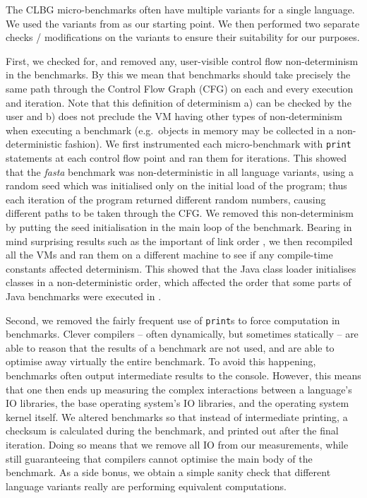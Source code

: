 \documentclass[10pt,preprint]{sigplanconf}
\newcommand{\fasta}{\emph{fasta}\xspace}
\begin{document}
The CLBG micro-benchmarks often have multiple variants for a single language. We
used the variants from \cite{bolz14impact} as our starting point. We then
performed two separate checks / modifications on the variants to ensure their
suitability for our purposes.

First, we checked for, and removed any, user-visible control flow
non-determinism in the benchmarks. By this we mean that benchmarks should take
precisely the same path through the Control Flow Graph (CFG) on each and every
execution and iteration. Note that
this definition of determinism a) can be checked by the user and b) does not
preclude the VM having other types of non-determinism when executing a benchmark
(e.g.~objects in memory may be collected in a non-deterministic fashion). We
first instrumented each micro-benchmark with \texttt{print} statements at each
control flow point and ran them for  iterations. This showed that
the \fasta benchmark was non-deterministic in all language variants, using a random seed which was
initialised only on the initial load of the program; thus each iteration of the
program returned different random numbers, causing different paths to be taken
through the CFG. We removed this non-determinism by putting the seed
initialisation in the main loop of the benchmark. Bearing in mind surprising
results such as the important of link order \cite{mytkowicz09surprising}, we
then recompiled all the VMs and ran them on a different machine to see if any
compile-time constants affected determinism.  This showed that the Java class loader
initialises classes in a non-deterministic order, which affected the order that
some parts of Java benchmarks were executed in  . 

 Second, we removed the fairly frequent use of
\texttt{print}s to force computation in benchmarks. Clever compilers -- often
dynamically, but sometimes statically -- are able to reason that the results of
a benchmark are not used, and are able to optimise away virtually the entire
benchmark. To avoid this happening, benchmarks often output intermediate results
to the console. However, this means that one then ends up measuring the complex
interactions between a language's IO libraries, the base operating system's IO
libraries, and the operating system kernel itself. We altered  benchmarks so that instead of intermediate printing, a checksum is
calculated during the benchmark, and printed out after the final iteration.
Doing so means that we remove all IO from our measurements, while still
guaranteeing that compilers cannot optimise the main body of the benchmark. As a
side bonus, we obtain a simple sanity check that different language variants
really are performing equivalent computations.
\end{document}
